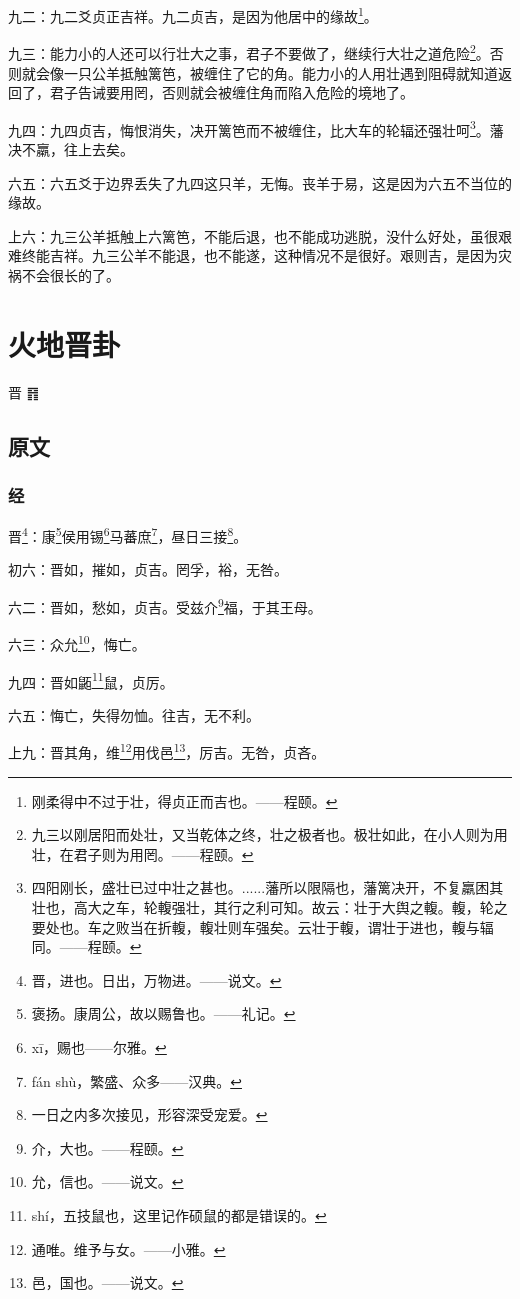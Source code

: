 \documentclass[12pt,oneside]{book}
\begin{document}
九二：九二爻贞正吉祥。九二贞吉，是因为他居中的缘故\footnote{刚柔得中不过于壮，得贞正而吉也。——程颐。}。

九三：能力小的人还可以行壮大之事，君子不要做了，继续行大壮之道危险\footnote{九三以刚居阳而处壮，又当乾体之终，壮之极者也。极壮如此，在小人则为用壮，在君子则为用罔。——程颐。}。否则就会像一只公羊抵触篱笆，被缠住了它的角。能力小的人用壮遇到阻碍就知道返回了，君子告诫要用罔，否则就会被缠住角而陷入危险的境地了。

九四：九四贞吉，悔恨消失，决开篱笆而不被缠住，比大车的轮辐还强壮呵\footnote{四阳刚长，盛壮已过中壮之甚也。......藩所以限隔也，藩篱决开，不复羸困其壮也，高大之车，轮輹强壮，其行之利可知。故云：壮于大舆之輹。輹，轮之要处也。车之败当在折輹，輹壮则车强矣。云壮于輹，谓壮于进也，輹与辐同。——程颐。}。藩决不羸，往上去矣。

六五：六五爻于边界丢失了九四这只羊，无悔。丧羊于易，这是因为六五不当位的缘故。

上六：九三公羊抵触上六篱笆，不能后退，也不能成功逃脱，没什么好处，虽很艰难终能吉祥。九三公羊不能退，也不能遂，这种情况不是很好。艰则吉，是因为灾祸不会很长的了。


\chapter{火地晋卦}
晋 {\Large ䷢}

\section{原文}

\subsection{经}
晋\footnote{晋，进也。日出，万物进。——说文。}：康\footnote{褒扬。康周公，故以赐鲁也。——礼记。}侯用锡\footnote{xī，赐也——尔雅。}马蕃庶\footnote{fán shù，繁盛、众多——汉典。}，昼日三接\footnote{一日之内多次接见，形容深受宠爱。}。

初六：晋如，摧如，贞吉。罔孚，裕，无咎。

六二：晋如，愁如，贞吉。受兹介\footnote{介，大也。——程颐。}福，于其王母。

六三：众允\footnote{允，信也。——说文。}，悔亡。

九四：晋如鼫\footnote{shí，五技鼠也，这里记作硕鼠的都是错误的。}鼠，贞厉。

六五：悔亡，失得勿恤。往吉，无不利。

上九：晋其角，维\footnote{通唯。维予与女。——小雅。}用伐邑\footnote{邑，国也。——说文。}，厉吉。无咎，贞吝。
\end{document}

